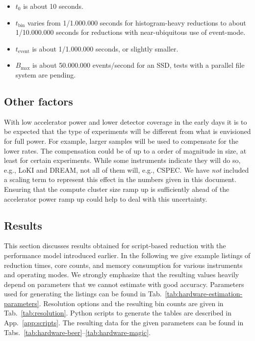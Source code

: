\documentclass[a4paper,english,numbers=noenddot,bibliography=totoc,chapterprefix=on,DIV=12]{scrartcl}
\newcommand{\Tbin}{t_{\text{bin}}}
\newcommand{\Tevent}{t_{\text{event}}}
\newcommand{\Bmax}{B_{\text{max}}}
\newcommand{\cspec}{CSPEC\xspace}
\newcommand{\dream}{DREAM\xspace}
\newcommand{\loki}{LoKI\xspace}
\begin{document}
\begin{itemize}
\item $t_0$ is about 10 seconds.
\item $\Tbin$ varies from 1/1.000.000 seconds for histogram-heavy reductions to about 1/10.000.000 seconds for reductions with near-ubiquitous use of event-mode.
\item $\Tevent$ is about 1/1.000.000 seconds, or slightly smaller.
\item $\Bmax$ is about 50.000.000 events/second for an SSD, tests with a parallel file system are pending.
\end{itemize}


\subsection{Other factors}

With low accelerator power and lower detector coverage in the early days it is to be expected that the type of experiments will be different from what is envisioned for full power.
For example, larger samples will be used to compensate for the lower rates.
The compensation could be of up to a order of magnitude in size, at least for certain experiments.
While some instruments indicate they will do so, e.g., \loki and \dream, not all of them will, e.g., \cspec.
We have \emph{not} included a scaling term to represent this effect in the numbers given in this document.
Ensuring that the compute cluster size ramp up is sufficiently ahead of the accelerator power ramp up could help to deal with this uncertainty.


\subsection{Results}
\label{sec:script-based-results}

This section discusses results obtained for script-based reduction with the performance model introduced earlier.
In the following we give example listings of reduction times, core counts, and memory consumption for various instruments and operating modes.
We strongly emphasize that the resulting values heavily depend on parameters that we cannot estimate with good accuracy.
Parameters used for generating the listings can be found in Tab.~\ref{tab:hardware-estimation-parameters}.
Resolution options and the resulting bin counts are given in Tab.~\ref{tab:resolution}.
Python scripts to generate the tables are described in App.~\ref{app:scripts}.
The resulting data for the given parameters can be found in Tabs.~\ref{tab:hardware-beer}--\ref{tab:hardware-magic}.
\end{document}
